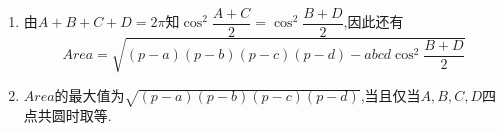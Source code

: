 \documentclass{article}
\begin{document}
\begin{rqq} $\ $
    \begin{enumerate}
        \item 由$A + B + C + D = 2 \pi$知$\cos^2 \dfrac{A + C}{2} = \cos^2 \dfrac{B + D}{2}$,因此还有
            \[ Area = \sqrt{(p - a)(p - b)(p - c)(p - d) - abcd \cos^2 \dfrac{B + D}{2}} \]
        \item $Area$的最大值为$\sqrt{(p - a)(p - b)(p - c)(p - d)}$,当且仅当$A, B, C, D$四点共圆时取等.
    \end{enumerate}
\end{rqq}
\end{document}
